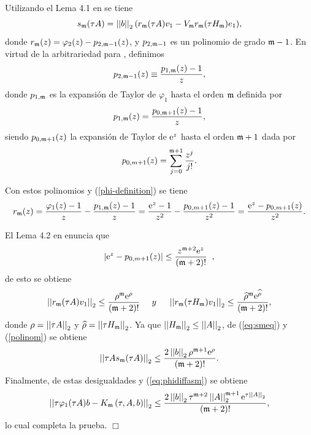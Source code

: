 Utilizando el Lema 4.1 en \cite{Saad92} se tiene
\begin{equation}
s_{\mathfrak{m}}(\tau A)=\left\lvert \left\lvert b \right\rvert \right\rvert_2 ( r_{\mathfrak{m}}(\tau A)v_1-V_{\mathfrak{m}} r_{\mathfrak{m}}(\tau H_{\mathfrak{m}})e_1) ,\label{eq:smeq}
\end{equation}
donde $r_{\mathfrak{m}}(z) = \varphi_{2}(z)-p_{2,\mathfrak{m}-1}(z)$, y $p_{2,\mathfrak{m}-1}$ es un polinomio de grado $\mathfrak{m}-1$. En virtud de la arbitrariedad para , definimos
\begin{equation*}
p_{2,\mathfrak{m}-1}(z)\equiv \frac{p_{1,\mathfrak{m}}(z)-1}{z},
\end{equation*}
donde $p_{1,\mathfrak{m}}$ es la expansión de Taylor de $\varphi_1$ hasta el orden  $\mathfrak{m}$
definida por
\[ p_{1,\mathfrak{m}}(z)= \frac{p_{0,\mathfrak{m}+1}(z)-1}{z}, \]
siendo $p_{0,\mathfrak{m}+1}(z)$ la expansión de Taylor de $\mathrm{e}^{z}$ hasta el orden $\mathfrak{m}+1$ dada por
\[ p_{0,m+1}(z)=\sum\limits^{\mathfrak{m}+1}_{j=0}\frac{z^j}{j!}. \]

Con estos polinomios y (\ref{phi-definition}) se tiene
\begin{equation*}
r_{\mathfrak{m}}(z) = \frac{\varphi_1(z)-1}{z}-\frac{p_{1,\mathfrak{m}}(z)-1}{z}=\frac{\mathrm{e}^{z}-1}{z^2}-\frac{p_{0,m+1}(z)-1}{z^2}
=\frac{\mathrm{e}^{z}-p_{0,m+1}(z)}{z^2}.
\end{equation*}

El Lema 4.2 en \cite{Saad92} enuncia que
\[ \left\lvert \mathrm{e}^{z}-p_{0,m+1}(z) \right\rvert \leq \frac{z^{\mathfrak{m}+2}\mathrm{e}^{z}}{(\mathfrak{m}+2)!}\;\;, \]
de esto se obtiene
\begin{equation}
\left\lvert \left\lvert r_{\mathfrak{m}}(\tau A)v_1 \right\rvert \right\rvert_2\leq \frac{\rho^{\mathfrak{m}}\mathrm{e}^{\rho}}{(\mathfrak{m}+2)!}\;\;\;\;\; y \;\;\;\;\; \left\lvert \left\lvert r_{\mathfrak{m}}(\tau H_{\mathfrak{m}})v_1 \right\rvert \right\rvert_2\leq \frac{\widehat{\rho}^{\mathfrak{m}}\mathrm{e}^{\widehat{\rho}}}{(\mathfrak{m}+2)!}, \label{polinom}
\end{equation}
donde $\rho=\left\lvert \left\lvert \tau A \right\rvert \right\rvert_2 $ y  $\widehat{\rho}=\left\lvert \left\lvert \tau H_{\mathfrak{m}} \right\rvert \right\rvert_2$. Ya que $\left\lvert \left\lvert H_{\mathfrak{m}} \right\rvert \right\rvert_2\leq\left\lvert \left\lvert A \right\rvert \right\rvert_2$, de (\ref{eq:smeq}) y (\ref{polinom}) se obtiene
\begin{equation*}
\left\lvert \left\lvert \tau As_{\mathfrak{m}}(\tau A) \right\rvert \right\rvert_2  \leq \frac{2 \left\lvert \left\lvert b \right\rvert \right\rvert_2\rho^{\mathfrak{m}+1}\mathrm{e}^{\rho}}{(\mathfrak{m}+2)!}.
\end{equation*}
Finalmente, de estas desigualdades y (\ref{eq:phidiffasm}) se obtiene
\begin{equation*}
\left\lvert \left\lvert \tau\varphi_1(\tau A)b - K_{\mathfrak{m}}\left(\tau,A , b \right) \right\rvert \right\rvert_2  \leq
\frac{2 \left\lvert \left\lvert b \right\rvert \right\rvert_2\tau^{\mathfrak{m}+2}\left\lvert \left\lvert A \right\rvert \right\rvert_2^{\mathfrak{m}+1}\mathrm{e}^{\tau \left\lvert \left\lvert A \right\rvert \right\rvert_2}}{(\mathfrak{m}+2)!},
\end{equation*}
lo cual completa la prueba. $\Box$

